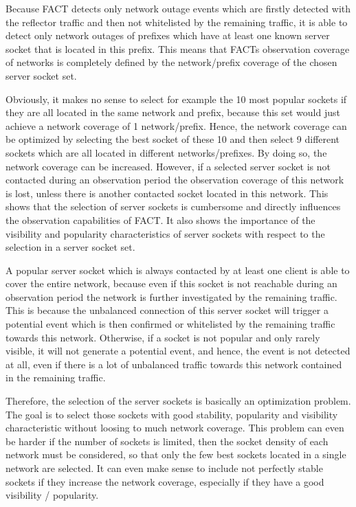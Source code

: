 Because \gls{FACT} detects only network outage events which are firstly detected  with the reflector traffic and then not whitelisted by the remaining traffic, it  is able to detect only network outages of prefixes which have at least one known  server socket that is located in this prefix. This means that FACTs observation  coverage of networks is completely defined by the network/prefix coverage of the  chosen \gls{server socket} set. 

Obviously, it makes no sense to select for example the 10 most popular sockets if they are all located in the same network and prefix, because this set would just achieve a network coverage of 1 network/prefix. 
Hence, the network coverage can be optimized by selecting the best socket of these 10 and then select 9 different sockets which are all located in different networks/prefixes. 
By doing so, the network coverage can be increased. However, if a selected  \gls{server socket} is not contacted during an observation period the observation coverage of this network is lost, unless there is another contacted socket located in this network. 
This shows that the selection of \glspl{server socket} is cumbersome and directly influences the observation capabilities of FACT. It also shows the importance of the visibility and popularity characteristics of \glspl{server socket} with respect to the selection in a \gls{server socket} set. 

A popular \gls{server socket} which is always contacted by at least one client is able to cover the entire network, because even if this socket is not reachable during an observation period the network is further investigated by the remaining traffic. 
This is because the unbalanced connection of this \gls{server socket} will trigger a potential event which is then confirmed or whitelisted by the  remaining traffic towards this network. 
Otherwise, if a socket is not popular and only rarely visible, it will not generate a potential event, and hence, the event is not detected at all, even if there is a lot of unbalanced traffic towards this network contained in the remaining traffic. 

Therefore, the selection of the \glspl{server socket} is basically an optimization problem. 
The goal is to select those sockets with good stability, popularity and visibility characteristic without loosing to much network coverage. 
This problem can even be harder if the number of sockets is limited, then the socket density of each network must be considered, so that only the few best sockets located in a single network are selected.
It can even make sense to include not perfectly 
stable sockets if they increase the network coverage, especially if they have a good visibility / popularity.

